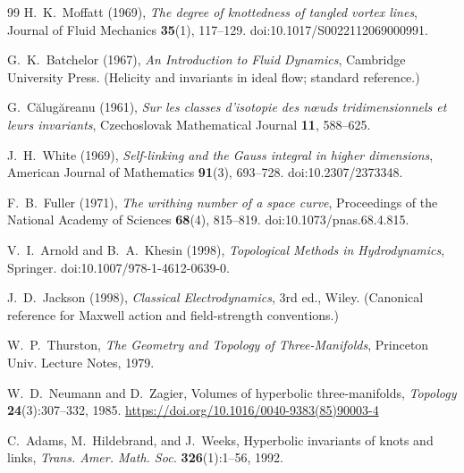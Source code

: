 


\begin{thebibliography}{99}
    H.~K.~Moffatt (1969),
    \textit{The degree of knottedness of tangled vortex lines},
    Journal of Fluid Mechanics \textbf{35}(1), 117--129.
    doi:10.1017/S0022112069000991.

    G.~K.~Batchelor (1967),
    \textit{An Introduction to Fluid Dynamics},
    Cambridge University Press.
    (Helicity and invariants in ideal flow; standard reference.)

    G.~C\u{a}lug\u{a}reanu (1961),
    \textit{Sur les classes d'isotopie des n{\oe}uds tridimensionnels et leurs invariants},
    Czechoslovak Mathematical Journal \textbf{11}, 588--625.

    J.~H.~White (1969),
    \textit{Self-linking and the Gauss integral in higher dimensions},
    American Journal of Mathematics \textbf{91}(3), 693--728.
    doi:10.2307/2373348.

    F.~B.~Fuller (1971),
    \textit{The writhing number of a space curve},
    Proceedings of the National Academy of Sciences \textbf{68}(4), 815--819.
    doi:10.1073/pnas.68.4.815.

    V.~I.~Arnold and B.~A.~Khesin (1998),
    \textit{Topological Methods in Hydrodynamics},
    Springer.
    doi:10.1007/978-1-4612-0639-0.

    J.~D.~Jackson (1998),
    \textit{Classical Electrodynamics}, 3rd ed.,
    Wiley.
    (Canonical reference for Maxwell action and field-strength conventions.)

    W.~P.~Thurston,
    \newblock \emph{The Geometry and Topology of Three-Manifolds},
    \newblock Princeton Univ. Lecture Notes, 1979.

    W.~D.~Neumann and D.~Zagier,
    \newblock Volumes of hyperbolic three-manifolds,
    \newblock \emph{Topology} \textbf{24}(3):307--332, 1985. \url{https://doi.org/10.1016/0040-9383(85)90003-4}

    C.~Adams, M.~Hildebrand, and J.~Weeks,
    \newblock Hyperbolic invariants of knots and links,
    \newblock \emph{Trans. Amer. Math. Soc.} \textbf{326}(1):1--56, 1992.


\end{thebibliography}
